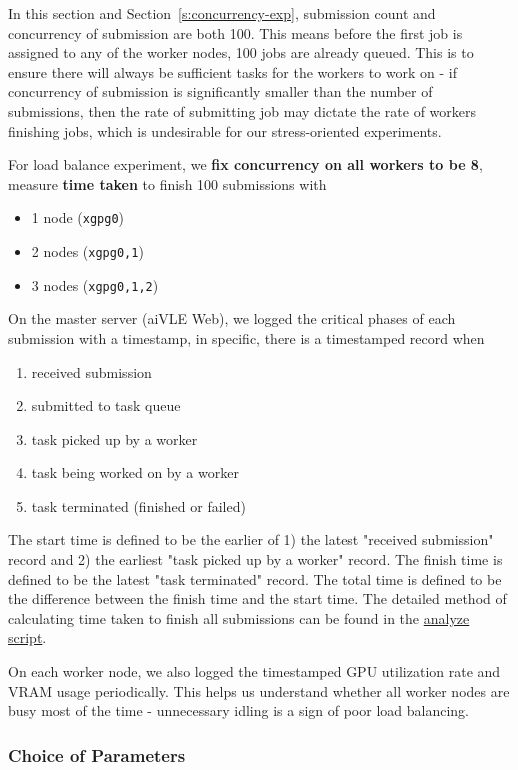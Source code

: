 In this section and Section~\ref{s:concurrency-exp}, submission count and concurrency of submission are both 100. This means before the first job is assigned to any of the worker nodes, 100 jobs are already queued. This is to ensure there will always be sufficient tasks for the workers to work on - if concurrency of submission is significantly smaller than the number of submissions, then the rate of submitting job may dictate the rate of workers finishing jobs, which is undesirable for our stress-oriented experiments.

For load balance experiment, we \textbf{fix concurrency on all workers to be 8}, measure \textbf{time taken} to finish 100 submissions with
\begin{itemize}
    \item 1 node (\texttt{xgpg0})
    \item 2 nodes (\texttt{xgpg0,1})
    \item 3 nodes (\texttt{xgpg0,1,2})
\end{itemize}

On the master server (aiVLE Web), we logged the critical phases of each submission with a timestamp, in specific, there is a timestamped record when
\begin{enumerate}
    \item received submission
    \item submitted to task queue
    \item task picked up by a worker
    \item task being worked on by a worker
    \item task terminated (finished or failed)
\end{enumerate}

The start time is defined to be the earlier of 1) the latest "received submission" record and 2) the earliest "task picked up by a worker" record. The finish time is defined to be the latest "task terminated" record. The total time is defined to be the difference between the finish time and the start time. The detailed method of calculating time taken to finish all submissions can be found in the \href{https://github.com/edu-ai/aivle-experiment-logs/blob/main/web/analyze.ipynb}{analyze script}.

On each worker node, we also logged the timestamped GPU utilization rate and VRAM usage periodically. This helps us understand whether all worker nodes are busy most of the time - unnecessary idling is a sign of poor load balancing.

\subsubsection{Choice of Parameters}
\label{sss:choice-of-params}


